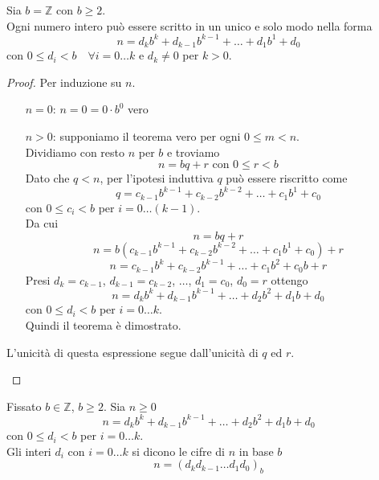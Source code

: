 \documentclass[a4paper,12pt, oneside]{book}
\begin{document}
	\begin{teorema}
		Sia $b = \mathbb{Z}$ con $b \geq 2$.\\
		Ogni numero intero può essere scritto in un unico e solo modo nella forma
		$$n = d_{k}b^{k} + d_{k-1}b^{k-1} + \dots + d_{1}b^{1} + d_{0}$$
		con $0 \leq d_i < b \quad \forall  i = 0 \dots k$ e $d_k \not = 0$ per $k>0$.
		
		\begin{proof}
			Per induzione su $n$.
			\begin{itemize}
				\item [$n = 0$:] $n = 0 = 0 \cdot b^0$ vero
				\item [$n > 0$:] supponiamo il teorema vero per ogni $0 \leq m < n$.\\
					Dividiamo con resto $n$ per $b$ e troviamo
					$$n = bq + r \mbox{ con } 0 \leq r < b$$
					Dato che $q < n$, per l'ipotesi induttiva $q$ può essere riscritto come
					$$q = c_{k-1}b^{k-1} + c_{k-2}b^{k-2} + \dots + c_{1}b^{1} + c_{0}$$
					con $0 \leq c_i < b$ per $i = 0 \dots (k-1)$.\\
					Da cui
					$$n = bq + r$$
					$$n = b(c_{k-1}b^{k-1} + c_{k-2}b^{k-2} + \dots + c_{1}b^{1} + c_{0}) +r$$
					$$n = c_{k-1}b^{k} + c_{k-2}b^{k-1} + \dots + c_{1}b^{2} + c_{0}b + r$$
					Presi $d_{k} = c_{k-1}$, $d_{k-1} = c_{k-2}$, $\dots$, $d_{1} = c_{0}$, $d_{0} = r$ ottengo
					$$n = d_{k}b^{k} + d_{k-1}b^{k-1} + \dots + d_{2}b^{2} + d_{1}b + d_0$$
					con $0 \leq d_i < b$ per $i = 0 \dots k$.\\
					Quindi il teorema è dimostrato.
			\end{itemize}

			\begin{nota}
				L'unicità di questa espressione segue dall'unicità di $q$ ed $r$.
			\end{nota}
			
		\end{proof}
	\end{teorema}
	\begin{definizione}
		Fissato $b \in \mathbb{Z}$, $b \geq 2$. Sia $n \geq 0$
		$$n = d_{k}b^{k} + d_{k-1}b^{k-1} + \dots + d_{2}b^{2} + d_{1}b + d_0$$
		con $0 \leq d_i < b$ per $i = 0 \dots k$.\\
		Gli interi $d_i$ con $i = 0 \dots k$ si dicono le cifre di $n$ in base $b$
		$$n = (d_k d_{k-1} \dots d_1 d_0)_b$$		
	\end{definizione}
	
\end{document}
